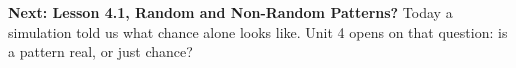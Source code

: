 \documentclass[12pt]{article}
\begin{document}
\vspace{0.04in}

\boxguard[4]
\begin{spiralbox}
\small
\textbf{Next: Lesson 4.1, Random and Non-Random Patterns?} Today a simulation told us what
chance alone looks like. Unit 4 opens on that question: is a pattern real, or just chance?
\end{spiralbox}
\end{document}
